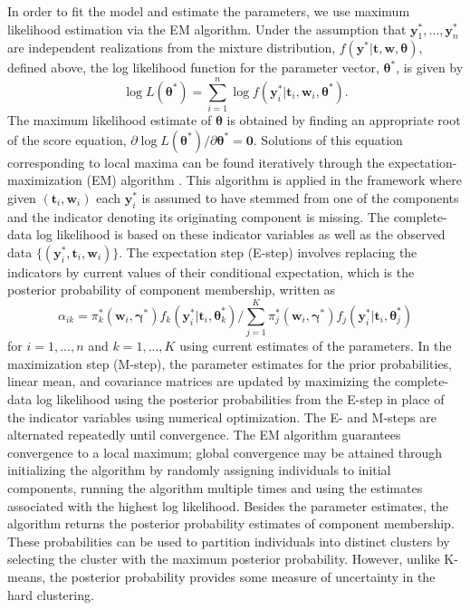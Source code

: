 \documentclass[12pt]{article}
\newcommand{\B}[0]{\mathbf}
\newcommand{\bs}[0]{\boldsymbol}
\begin{document}
In order to fit the model and estimate the parameters, we use maximum likelihood estimation via the EM algorithm. Under the assumption that $\B y^{*}_{1},...,\B y^{*}_{n}$ are independent realizations from the mixture distribution, $f(\B y^{*} | \B t, \B w, \bs\theta)$, defined above, the log likelihood function for the parameter vector, $\bs \theta^{*}$, is given by
$$\log L(\bs\theta^{*})=\sum^{n}_{i=1}\log f(\B y^{*}_{i}|\B t_{i},\B w_{i},\bs \theta^{*}).$$
The maximum likelihood estimate of $\bs\theta$ is obtained by finding an appropriate root of the score equation, $\partial \log L(\bs\theta^{*})/\partial \bs\theta^{*}=\B 0.$ Solutions of this equation corresponding to local maxima can be found iteratively through the expectation-maximization (EM) algorithm \cite{dempster1977}. This algorithm is applied in the framework where given $(\B t_{i},\B w_{i})$ each $\B y^{*}_{i}$ is assumed to have stemmed from one of the components and the indicator denoting its originating component is missing. The complete-data log likelihood is based on these indicator variables as well as the observed data $\{(\B y^{*}_{i}, \B t_{i}, \B w_{i})\}$. The expectation step (E-step) involves replacing the indicators by current values of their conditional expectation, which is the posterior probability of component membership, written as
$$\alpha_{ik}=\pi^{*}_{k}(\B w_{i},\bs\gamma^{*})f_{k}(\B y^{*}_{i}|\B t_{i},\bs\theta_{k}^{*})/\sum_{j=1}^{K}\pi^{*}_{j}(\B w_{i},\bs\gamma^{*})f_{j}(\B y^{*}_{i}|\B t_{i},\bs \theta_{j}^{*})$$
for $i=1,...,n$ and $k=1,...,K$ using current estimates of the parameters. In the maximization step (M-step), the parameter estimates for the prior probabilities, linear mean, and covariance matrices are updated by maximizing the complete-data log likelihood using the posterior probabilities from the E-step in place of the indicator variables using numerical optimization. The E- and M-steps are alternated repeatedly until convergence. The EM algorithm guarantees convergence to a local maximum; global convergence may be attained through initializing the algorithm by randomly assigning individuals to initial components, running the algorithm multiple times and using the estimates associated with the highest log likelihood. Besides the parameter estimates, the algorithm returns the posterior probability estimates of component membership. These probabilities can be used to partition individuals into distinct clusters by selecting the cluster with the maximum posterior probability. However, unlike K-means, the posterior probability provides some measure of uncertainty in the hard clustering. 
\end{document}

